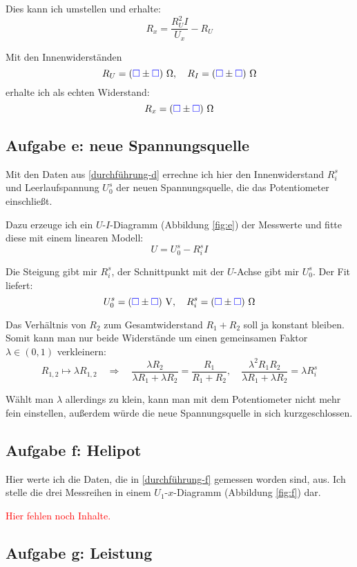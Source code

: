 \documentclass[11pt, ngerman]{article}
\newcommand{\messwert}{\textcolor{blue}{\square}}
\newcommand{\emesswert}{\left(\messwert \pm \messwert \right)}
\newcommand{\fehlt}{\textcolor{red}{Hier fehlen noch Inhalte.}}
\begin{document}
Dies kann ich umstellen und erhalte:
\[ R_x = \frac{R_U^2 I}{U_x} - R_U \]

Mit den Innenwiderständen
\[
	R_U = \unit[\emesswert] \Omega,
	\quad
	R_I = \unit[\emesswert] \Omega
\]
erhalte ich als echten Widerstand:
\[ R_x = \unit[\emesswert] \Omega \]

\subsection{Aufgabe e: neue Spannungsquelle}

\label{auswertung-e}

Mit den Daten aus \ref{durchführung-d} errechne ich hier den Innenwiderstand
$R_i^s$ und Leerlaufspannung $U_0^s$ der neuen Spannungsquelle, die das
Potentiometer einschließt.

Dazu erzeuge ich ein $U$-$I$-Diagramm (Abbildung \ref{fig:e}) der Messwerte und
fitte diese mit einem linearen Modell:
\[ U = U_0^s - R_i^s I \]

Die Steigung gibt mir $R_i^s$, der Schnittpunkt mit der $U$-Achse gibt mir $U_0^s$. Der Fit liefert:
\[
	U_0^s = \unit[\emesswert] V,
	\quad
	R_i^s = \unit[\emesswert] \Omega
\]

Das Verhältnis von $R_2$ zum Gesamtwiderstand $R_1 + R_2$ soll ja konstant
bleiben. Somit kann man nur beide Widerstände um einen gemeinsamen Faktor
$\lambda \in (0, 1)$ verkleinern:
\[
	R_{1,2} \mapsto \lambda R_{1,2}
	\quad \Rightarrow \quad
	\frac{\lambda R_2}{\lambda R_1 + \lambda R_2} = \frac{R_1}{R_1 + R_2},
	\quad
	\frac{\lambda^2 R_1 R_2}{\lambda R_1 + \lambda R_2} = \lambda R_i^s
\]

Wählt man $\lambda$ allerdings zu klein, kann man mit dem Potentiometer nicht
mehr fein einstellen, außerdem würde die neue Spannungsquelle in sich
kurzgeschlossen.

\subsection{Aufgabe f: Helipot}

\label{auswertung-f}

Hier werte ich die Daten, die in \ref{durchführung-f} gemessen worden sind,
aus. Ich stelle die drei Messreihen in einem $U_1$-$x$-Diagramm (Abbildung
\ref{fig:f}) dar.

\fehlt

\subsection{Aufgabe g: Leistung}
\end{document}
